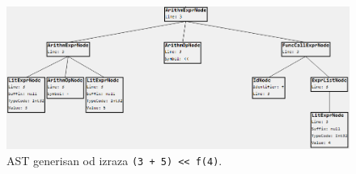 \begin{figure}[h!]
\centering
\includegraphics[scale=0.6]{images/ast_expr.png}
\caption{AST generisan od izraza \texttt{(3 + 5) << f(4)}.}
\label{fig:MyASTExampleExpressions}
\end{figure}
